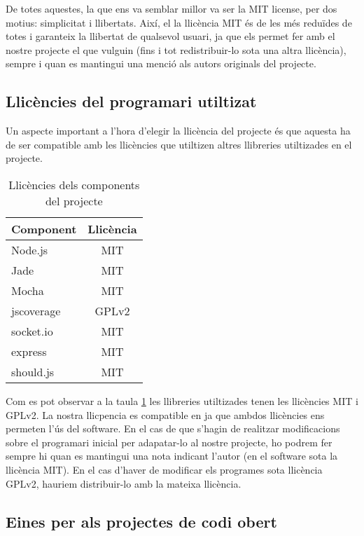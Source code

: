 De totes aquestes, la que ens va semblar millor va ser la MIT license, per dos motius: simplicitat i llibertats. Així, el la llicència MIT és de les més reduïdes de totes i garanteix la llibertat de qualsevol usuari, ja que els permet fer amb el nostre projecte el que vulguin (fins i tot redistribuir-lo sota una altra llicència), sempre i quan es mantingui una menció als autors originals del projecte.

\subsection{Llicències del programari utiltizat}

Un aspecte important a l'hora d'elegir la llicència del projecte és que aquesta ha de ser compatible amb les llicències que utiltizen altres llibreries utiltizades en el projecte. 

\begin{table}[htbp]\begin{center}\begin{tabular}{|l|c|}
\hline
\textbf{Component} & \textbf{Llicència} \\ \hline
Node.js & MIT \\ \hline
Jade & MIT\\ \hline
Mocha & MIT \\ \hline
jscoverage & GPLv2 \\ \hline
socket.io & MIT \\ \hline
express & MIT  \\ \hline
should.js & MIT \\ \hline
\end{tabular}\end{center}
\caption{Llicències dels components del projecte}\label{t:llicencies-components}
\end{table} 

Com es pot observar a la taula \ref{t:llicencies-components} les llibreries utiltizades tenen les llicències MIT i GPLv2. La nostra llicpencia es compatible en ja que ambdos llicències ens permeten l'ús del software. En el cas de que s'hagin de realitzar modificacions sobre el programari inicial per adapatar-lo al nostre projecte, ho podrem fer sempre hi quan es mantingui una nota indicant l'autor (en el software sota la llicència MIT). En el cas d'haver de modificar els programes sota llicència GPLv2, hauriem distribuir-lo amb la mateixa llicència. 

\subsection{Eines per als projectes de codi obert}

